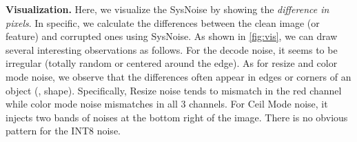 \begin{table}[h]
\centering
\caption{Mix training on the decoder.}
\label{tab:mix_decoder}
\end{table}



\textbf{Visualization.} Here, we visualize the SysNoise by showing the \emph{difference in pixels}. In specific, we calculate the differences between the clean image (or feature) and corrupted ones using SysNoise. As shown in \autoref{fig:vis}, we can draw several interesting observations as follows. For the decode noise, it seems to be irregular (totally random or centered around the edge). As for resize and color mode noise, we observe that the differences often appear in edges or corners of an object (\ie, shape). Specifically, Resize noise tends to mismatch in the red channel while color mode noise mismatches in all 3 channels. For Ceil Mode noise, it injects two bands of noises at the bottom right of the image. There is no obvious pattern for the INT8 noise.


